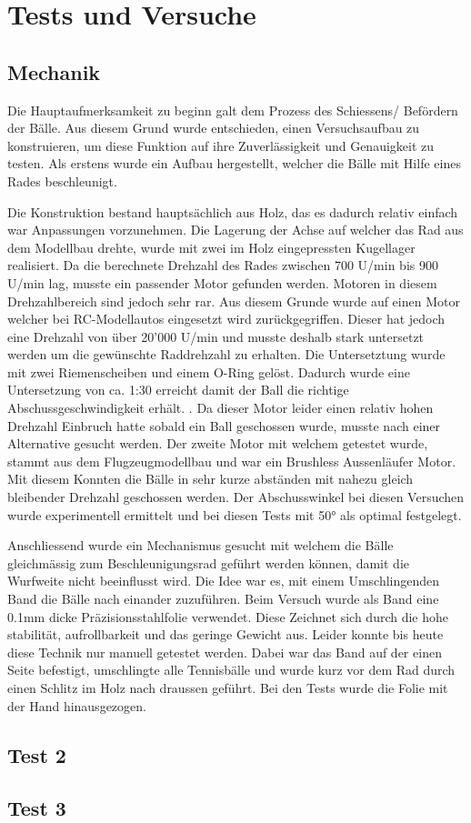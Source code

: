 \section{Tests und Versuche}

\subsection{Mechanik}


Die Hauptaufmerksamkeit zu beginn galt dem Prozess des Schiessens/ Befördern der Bälle. Aus diesem Grund wurde entschieden, einen Versuchsaufbau zu konstruieren, um diese Funktion auf ihre Zuverlässigkeit und Genauigkeit zu testen. Als erstens wurde ein Aufbau hergestellt, welcher die Bälle mit Hilfe eines Rades beschleunigt.

Die Konstruktion bestand hauptsächlich aus Holz, das es dadurch relativ einfach war Anpassungen vorzunehmen. Die Lagerung der Achse auf welcher das Rad aus dem Modellbau drehte, wurde mit zwei im Holz eingepressten Kugellager realisiert. Da die berechnete Drehzahl des Rades zwischen 700 U/min bis 900 U/min lag, musste ein passender Motor gefunden werden. Motoren in diesem Drehzahlbereich sind jedoch sehr rar. Aus diesem Grunde wurde auf einen Motor welcher bei RC-Modellautos eingesetzt wird zurückgegriffen. Dieser hat jedoch eine Drehzahl von über 20'000 U/min und musste deshalb stark untersetzt werden um die gewünschte Raddrehzahl zu erhalten. Die Untersetztung wurde mit zwei Riemenscheiben und einem O-Ring gelöst. Dadurch wurde eine Untersetzung von ca. 1:30 erreicht damit der Ball die richtige Abschussgeschwindigkeit erhält. . Da dieser Motor leider einen relativ hohen Drehzahl Einbruch hatte sobald ein Ball geschossen wurde, musste nach einer Alternative gesucht werden. Der zweite Motor mit welchem getestet wurde, stammt aus dem Flugzeugmodellbau und war ein Brushless Aussenläufer Motor. Mit diesem Konnten die Bälle in sehr kurze abständen mit nahezu gleich bleibender Drehzahl geschossen werden.
Der Abschusswinkel bei diesen Versuchen wurde experimentell ermittelt und bei diesen Tests mit 50° als optimal festgelegt. 


Anschliessend wurde ein Mechanismus gesucht mit welchem die Bälle gleichmässig zum Beschleunigungsrad geführt werden können, damit die Wurfweite nicht beeinflusst wird. Die Idee war es, mit einem Umschlingenden Band die Bälle nach einander zuzuführen. Beim Versuch wurde als Band eine 0.1mm dicke Präzisionsstahlfolie verwendet. Diese Zeichnet sich durch die hohe stabilität, aufrollbarkeit und das geringe Gewicht aus. Leider konnte bis heute diese Technik nur manuell getestet werden. Dabei war das Band auf der einen Seite befestigt, umschlingte alle Tennisbälle und wurde kurz vor dem Rad durch einen Schlitz im Holz nach draussen geführt. Bei den Tests wurde die Folie mit der Hand hinausgezogen. 




\subsection{Test 2}

\subsection{Test 3}